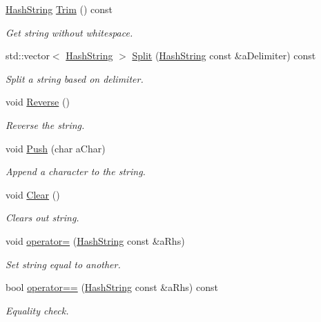 \begin{DoxyCompactItemize}
\hyperlink{classHashString}{Hash\+String} \hyperlink{classHashString_a3fefba6d6e64a661e745f406a93337bc}{Trim} () const 
\begin{DoxyCompactList}\small\item\em Get string without whitespace. \end{DoxyCompactList}\item 
std\+::vector$<$ \hyperlink{classHashString}{Hash\+String} $>$ \hyperlink{classHashString_a280b286cd77c5168087528db6c058868}{Split} (\hyperlink{classHashString}{Hash\+String} const \&a\+Delimiter) const 
\begin{DoxyCompactList}\small\item\em Split a string based on delimiter. \end{DoxyCompactList}\item 
void \hyperlink{classHashString_ab3dca820267c57b30a290eafcda8b69f}{Reverse} ()
\begin{DoxyCompactList}\small\item\em Reverse the string. \end{DoxyCompactList}\item 
void \hyperlink{classHashString_aed455d43b41c82f15fa39b8028cf2883}{Push} (char a\+Char)
\begin{DoxyCompactList}\small\item\em Append a character to the string. \end{DoxyCompactList}\item 
void \hyperlink{classHashString_a3ce29e7a4de6781671cca6bef5d929fd}{Clear} ()
\begin{DoxyCompactList}\small\item\em Clears out string. \end{DoxyCompactList}\item 
void \hyperlink{classHashString_a7785f58363aba20e3a8fe9f110334347}{operator=} (\hyperlink{classHashString}{Hash\+String} const \&a\+Rhs)
\begin{DoxyCompactList}\small\item\em Set string equal to another. \end{DoxyCompactList}\item 
bool \hyperlink{classHashString_aeb5850f42dad4711596ee5b4848eae28}{operator==} (\hyperlink{classHashString}{Hash\+String} const \&a\+Rhs) const 
\begin{DoxyCompactList}\small\item\em Equality check. \end{DoxyCompactList}\item 

\end{DoxyCompactItemize}
